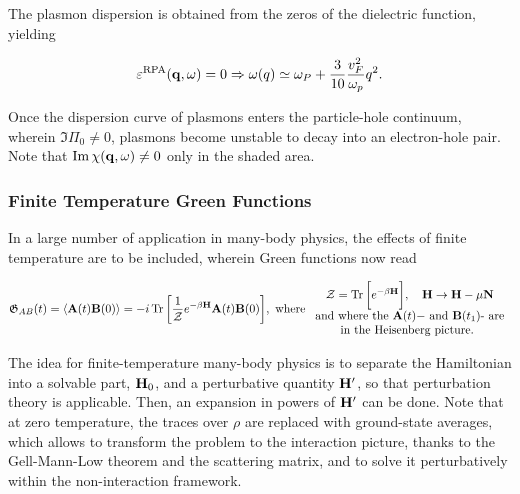 The plasmon dispersion is obtained from the zeros of the dielectric function, yielding 

\begin{equation*}
    \varepsilon^{\textnormal{RPA}}({\bf q}, \omega) = 0 \Rightarrow \omega(q) \simeq \omega_P + \frac{3}{10} \frac{v_F^2}{\omega_p} q^2. 
\end{equation*}

Once the dispersion curve of plasmons enters the particle-hole continuum, wherein $\Im \Pi_0 \neq 0$, plasmons become unstable to decay into an electron-hole pair. Note that $\Im \chi({\bf q}, \omega) \neq 0$ only in the shaded area. \\

\subsubsection{Finite Temperature Green Functions}
\label{section:finite_T_QFT}

In a large number of application in many-body physics, the effects of finite temperature are to be included, wherein Green functions now read

\begin{equation}
    \mathfrak{G}_{AB}(t) = \langle {\bf A}(t) {\bf B}(0) \rangle = -i \Tr \bigg[\frac{1}{\mathcal{Z}} e^{-\beta {\bf H}} {\bf A}(t) {\bf B}(0)\bigg], \textnormal{ where } \begin{array}{cc}
         \mathcal{Z} = \Tr \bigg[e^{-\beta {\bf H}}\bigg], \quad
         {\bf H} \rightarrow {\bf H} - \mu {\bf N} \\
         \textnormal{and where the ${\bf A}(t)-$ and ${\bf B}(t_1)$- are} \\
         \textnormal{in the Heisenberg picture. }
    \end{array}
\end{equation}

The idea for finite-temperature many-body physics is to separate the Hamiltonian into a solvable part, ${\bf H}_0$, and a perturbative quantity ${\bf H'}$, so that perturbation theory is applicable. Then, an expansion in powers of ${\bf H'}$ can be done. Note that at zero temperature, the traces over $\rho$ are replaced with ground-state averages, which allows to transform the problem to the interaction picture, thanks to the Gell-Mann-Low theorem and the scattering matrix, and to solve it perturbatively within the non-interaction framework. \\

